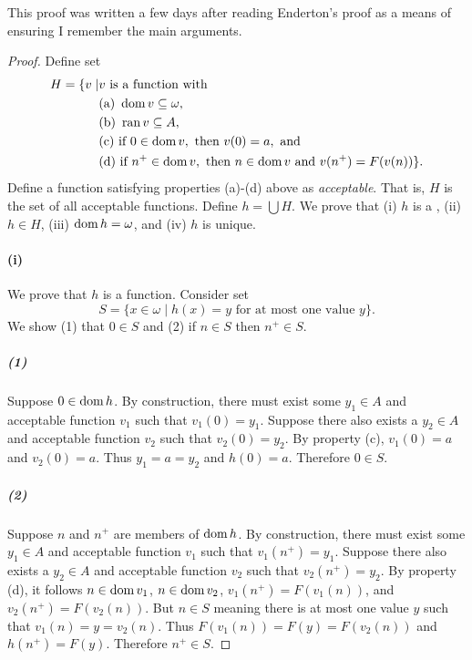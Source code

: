 \documentclass{report}
\begin{document}
\begin{note}
  This proof was written a few days after reading Enderton's proof as a means of
  ensuring I remember the main arguments.
\end{note}

\begin{proof}

  Define set
    \begin{align*}
      H = \{ v \mid & v \text{ is a function with } \\
        & \text{(a) } \mathop{\text{dom}}{v} \subseteq \omega, \\
        & \text{(b) } \mathop{\text{ran}}{v} \subseteq A, \\
        & \text{(c) if } 0 \in \mathop{\text{dom}}{v}, \text{ then } v(0) = a, \text{ and} \\
        & \text{(d) if } n^+ \in \mathop{\text{dom}}{v},
          \text{ then } n \in \mathop{\text{dom}}{v} \text{ and } v(n^+) = F(v(n))
      \}.
    \end{align*}
  Define a function satisfying properties (a)-(d) above as \textit{acceptable}.
  That is, $H$ is the set of all acceptable functions.
  Define $h = \bigcup H$.
  We prove that (i) $h$ is a , (ii) $h \in H$, (iii)
    $\mathop{\text{dom}}{h} = \omega$, and (iv) $h$ is unique.

  \paragraph{(i)}%
  \label{par:recursion-theorem-natural-numbers-i}

    We prove that $h$ is a function.
    Consider set
      $$S = \{x \in \omega \mid h(x) = y \text{ for at most one value } y\}.$$
    We show (1) that $0 \in S$ and (2) if $n \in S$ then $n^+ \in S$.

    \subparagraph{(1)}%
    \label{spar:recursion-theorem-natural-numbers-i-1}

      Suppose $0 \in \mathop{\text{dom}}{h}$.
      By construction, there must exist some $y_1 \in A$ and acceptable function
        $v_1$ such that $v_1(0) = y_1$.
      Suppose there also exists a $y_2 \in A$ and acceptable function $v_2$ such
        that $v_2(0) = y_2$.
      By property (c), $v_1(0) = a$ and $v_2(0) = a$.
      Thus $y_1 = a = y_2$ and $h(0) = a$.
      Therefore $0 \in S$.

    \subparagraph{(2)}%
    \label{spar:recursion-theorem-natural-numbers-i-2}

      Suppose $n$ and $n^+$ are members of $\mathop{\text{dom}}{h}$.
      By construction, there must exist some $y_1 \in A$ and acceptable function
        $v_1$ such that $v_1(n^+) = y_1$.
      Suppose there also exists a $y_2 \in A$ and acceptable function $v_2$ such
        that $v_2(n^+) = y_2$.
      By property (d), it follows $n \in \mathop{\text{dom}}{v_1}$, $n \in \mathop{\text{dom}}{v_2}$,
        $v_1(n^+) = F(v_1(n))$, and $v_2(n^+) = F(v_2(n))$.
      But $n \in S$ meaning there is at most one value $y$ such that
        $v_1(n) = y = v_2(n)$.
      Thus $F(v_1(n)) = F(y) = F(v_2(n))$ and $h(n^+) = F(y)$.
      Therefore $n^+ \in S$.


\end{proof}
\end{document}

